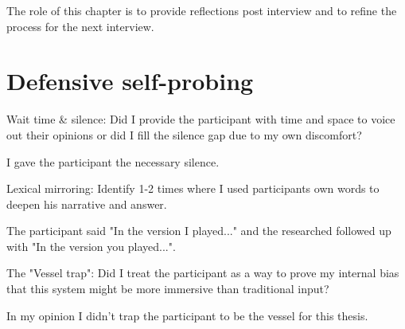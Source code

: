 
The role of this chapter is to provide reflections post interview and to refine the process for the next interview.

\section{Defensive self-probing}

\begin{QandA}
   \item Wait time \& silence: Did I provide the participant with time and space to voice out their opinions or did I fill the silence gap due to my own discomfort?
        \begin{answered}
           I gave the participant the necessary silence.
        \end{answered}

   \item Lexical mirroring: Identify 1-2 times where I used participants own words to deepen his narrative and answer.

        \begin{answered}
        The participant said "In the version I played..." and the researched followed up with "In the version you played...".
        \end{answered}

    \item The "Vessel trap": Did I treat the participant as a way to prove my internal bias that this system might be more immersive than traditional input?

        \begin{answered}
            In my opinion I didn't trap the participant to be the vessel for this thesis.
        \end{answered}
\end{QandA}



    



